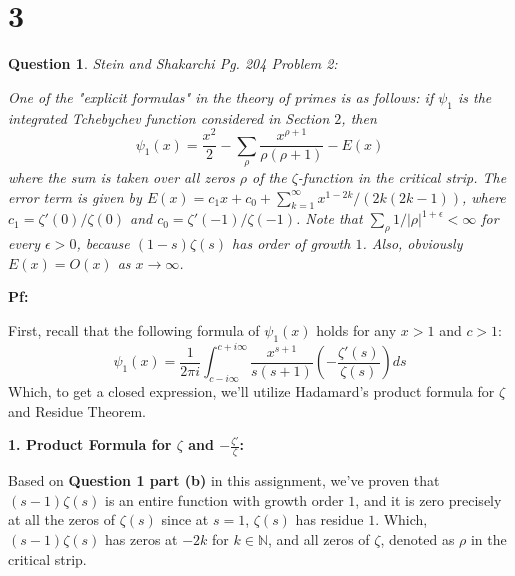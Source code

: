 \documentclass{article}
\newtheorem{question}{Question}
\begin{document}
\begin{itemize}
\end{itemize}

\break

\section*{3}
\begin{myBox}[]{}
    \begin{question}
        Stein and Shakarchi Pg. 204 Problem 2:

        One of the "explicit formulas" in the theory of primes is as follows: if $\psi_1$ is the integrated Tchebychev function considered in Section $2$, then 
        $$\psi_1(x)=\frac{x^2}{2}-\sum_{\rho}\frac{x^{\rho+1}}{\rho(\rho+1)}-E(x)$$
        where the sum is taken over all zeros $\rho$ of the $\zeta$-function in the critical strip. The error term is given by $E(x)=c_1x+c_0+\sum_{k=1}^{\infty}x^{1-2k}/(2k(2k-1))$, where $c_1=\zeta'(0)/\zeta(0)$ and $c_0=\zeta'(-1)/\zeta(-1)$. Note that $\sum_{\rho}1/|\rho|^{1+\epsilon}<\infty$ for every $\epsilon>0$, because $(1-s)\zeta(s)$ has order of growth $1$. Also, obviously $E(x)=O(x)$ as $x\rightarrow\infty$.
    \end{question}
\end{myBox}

\textbf{Pf:}

First, recall that the following formula of $\psi_1(x)$ holds for any $x>1$ and $c>1$:
$$\psi_1(x)=\frac{1}{2\pi i}\int_{c-i\infty}^{c+i\infty}\frac{x^{s+1}}{s(s+1)}\left(-\frac{\zeta'(s)}{\zeta(s)}\right)ds$$
Which, to get a closed expression, we'll utilize Hadamard's product formula for $\zeta$ and Residue Theorem.

\hfil

\textbf{1. Product Formula for $\zeta$ and $-\frac{\zeta'}{\zeta}$:}

Based on \textbf{Question 1 part (b)} in this assignment, we've proven that $(s-1)\zeta(s)$ is an entire function with growth order $1$, and it is zero precisely at all the zeros of $\zeta(s)$ since at $s=1$, $\zeta(s)$ has residue $1$. Which, $(s-1)\zeta(s)$ has zeros at $-2k$ for $k\in\mathbb{N}$, and all zeros of $\zeta$, denoted as $\rho$ in the critical strip.
\end{document}
